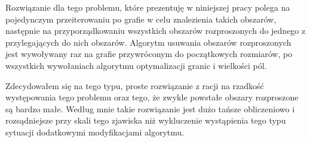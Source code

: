 Rozwiązanie dla tego problemu, które prezentuję w niniejszej pracy polega na pojedynczym przeiterowaniu po grafie
w celu znalezienia takich obszarów, następnie na przyporządkowaniu wszystkich obszarów rozproszonych do jednego
z przylegających do nich obszarów.
Algorytm usuwania obszarów rozproszonych jest wywoływany raz na grafie przywróconym do początkowych rozmiarów,
po wszystkich wywołaniach
algorytmu optymalizacji granic i wielkości pól.

Zdecydowałem się na tego typu, proste rozwiązanie z racji na rzadkość występowania tego problemu oraz tego, że zwykle
powstałe obszary rozproszone są bardzo małe.
Według mnie takie rozwiązanie jest dużo tańsze obliczeniowo i rozsądniejsze przy skali tego
zjawiska niż wykluczenie wystąpienia tego typu sytuacji dodatkowymi modyfikacjami algorytmu.